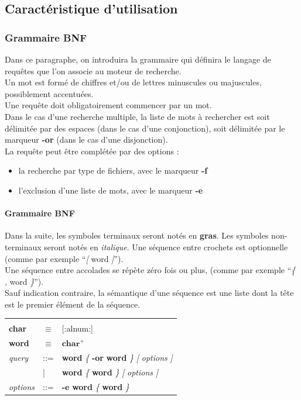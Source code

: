 \subsection{Caractéristique d'utilisation}

\subsubsection{Grammaire BNF}
Dans ce paragraphe, on introduira la grammaire qui définira le langage de requêtes que l'on associe au moteur de recherche.\\

Un mot est formé de chiffres et/ou de lettres minuscules ou majuscules, possiblement accentuées.\\

Une requête doit obligatoirement commencer par un mot.\\

Dans le cas d'une recherche multiple, la liste de mots à rechercher est soit délimitée par 
des espaces (dans le cas d'une conjonction), soit délimitée par le marqueur \textbf{-or} (dans le
cas d'une disjonction).\\

La requête peut être complétée par des options :
\begin{itemize}
 \item la recherche par type de fichiers, avec le marqueur \textbf{-f}
 \item l'exclusion d'une liste de mots, avec le marqueur \textbf{-e}
 \end{itemize}

\paragraph{Grammaire BNF\\}
Dans la suite, les symboles terminaux seront notés en \textbf{gras}.
Les symboles non-terminaux seront notés en \textit{italique}. Une séquence entre crochets est optionnelle (comme par exemple ``\textit{[} word \textit{]}'').\\
Une séquence entre accolades se répète zéro fois ou plus, (comme par exemple ``\textit{\{} , word \textit{\}}'').\\
Sauf indication contraire, la sémantique d’une séquence est une liste dont la tête est le premier élément de la séquence.\\

\begin{tabular}{p{1.5cm} p{0.5cm} p{9cm} }
& & \\
\textbf{char} & $\equiv$ & [:alnum:]\\
\textbf{word} & $\equiv$ & $\textbf{char}^+$\\
\textit{query} & ::= & \textbf{word} \textit{\{} \textbf{-or} \textbf{word} \textit{\}} \textit{[} \textit{options} \textit{]}\\
& | & \textbf{word} \textit{\{} \textbf{word} \textit{\}} \textit{[} \textit{options} \textit{]}\\
\textit{options} & ::= & \textbf{-e} \textbf{word} \textit{\{} \textbf{word} \textit{\}}\\
\end{tabular}

